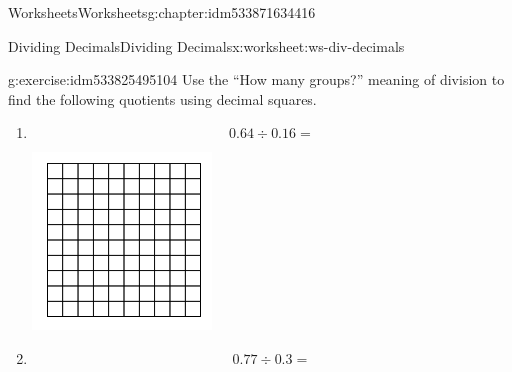 \documentclass[twoside,11pt,]{book}
\begin{document}
\begin{chapterptx}{Worksheets}{}{Worksheets}{}{}{g:chapter:idm533871634416}
%
\begin{worksheet-section-numberless}{Dividing Decimals}{}{Dividing Decimals}{}{}{x:worksheet:ws-div-decimals}
\begin{divisionexercise}{1}{}{}{g:exercise:idm533825495104}%
Use the ``How many groups?'' meaning of division to find the following quotients using decimal squares.%
%
\begin{enumerate}[label=(\alph*)]
\item{}%
\begin{equation*}
0.64 \div 0.16 = 
\end{equation*}
\begin{sidebyside}{1}{0.3}{0.3}{0}%
\begin{sbspanel}{0.4}%
\includegraphics[width=1\linewidth]{images/decimal-square.png}
\end{sbspanel}%
\end{sidebyside}%
%
\item{}%
\begin{equation*}
0.77 \div 0.3 = 
\end{equation*}
\begin{sidebyside}{1}{0.3}{0.3}{0}%
\begin{sbspanel}{0.4}%

\end{sbspanel}
\end{sidebyside}
\end{enumerate}
\end{divisionexercise}
\end{worksheet-section-numberless}
\end{chapterptx}
\end{document}
